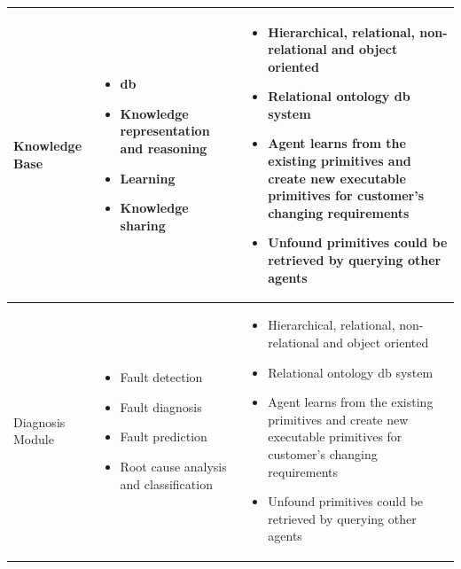 \begin{table}[p]
\begin{tabularx}{\textwidth}{|Y|Z|W|}
    Knowledge Base & 
    \vspace{-10pt}
    \begin{itemize}
        \item \gls{db}
        \item Knowledge representation and reasoning 
        \item Learning 
        \item Knowledge sharing 
    \end{itemize}
    & 
    \vspace{-10pt}
    \begin{itemize}
        \item Hierarchical, relational, non-relational and object oriented
        \item Relational ontology \gls{db} system
        \item Agent learns from the existing primitives and create new executable primitives for customer's changing requirements
        \item Unfound primitives could be retrieved by querying other agents
    \end{itemize} \\
    \hline

    Diagnosis Module & 
    \vspace{-10pt}
    \begin{itemize}
        \item Fault detection 
        \item Fault diagnosis 
        \item Fault prediction 
        \item Root cause analysis and classification
    \end{itemize}
    & 
    \vspace{-10pt}
    \begin{itemize}
        \item Hierarchical, relational, non-relational and object oriented
        \item Relational ontology \gls{db} system
        \item Agent learns from the existing primitives and create new executable primitives for customer's changing requirements
        \item Unfound primitives could be retrieved by querying other agents
    \end{itemize} \\
    \hline


\end{tabularx}
\end{table}
